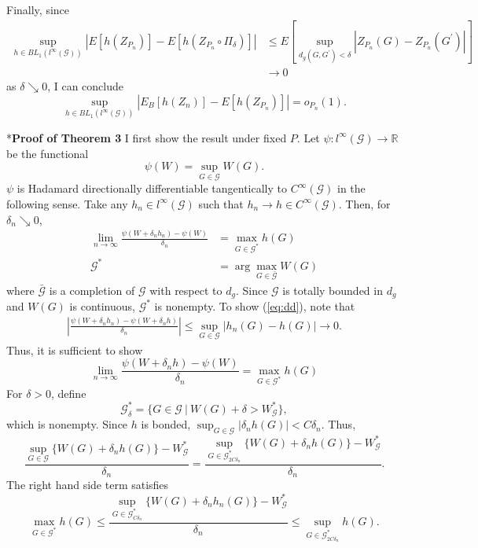 \documentclass[12pt,oneside,reqno,english]{amsart}
\makeatletter
\renewcommand\subsection{\@startsection{subsection}{2}%
  \z@{-.5\linespacing\@plus-.7\linespacing}{.5\linespacing}%
  {\normalfont\scshape}}
\theoremstyle{definition}
\makeatother
\begin{document}
Finally, since
\begin{align*}
\sup_{h\in BL_{1}(l^{\infty}(\mathcal{G}))}|E[h(Z_{P_{n}})]-E[h(Z_{P_{n}}\circ \Pi_{\delta})]|
&\leq E\left[\sup_{d_{g}(G,G^{\prime})<\delta}|Z_{P_{n}}(G)-Z_{P_{n}}(G^{\prime})|\right]\\
&\rightarrow 0
\end{align*}
as $\delta\searrow 0$, I can conclude
\[\sup_{h\in BL_{1}(l^{\infty}(\mathcal{G}))}|E_{B}[h(Z_{n})]-E[h(Z_{P_{n}})]|=o_{P_{n}}(1).\] 

\subsection*{\bf{Proof of Theorem 3}}
I first show the result under fixed $P$. 
Let $\psi:l^{\infty}(\mathcal{G})\rightarrow \mathbb{R}$ be the functional 
\[\psi(W)=\sup_{G\in \mathcal{G}}W(G).\]
$\psi$ is Hadamard directionally differentiable tangentically to $C^{\infty}(\mathcal{G})$ in the following sense. 
Take any $h_{n}\in l^{\infty}(\mathcal{G})$ such that $h_{n}\rightarrow h\in C^{\infty}(\mathcal{G})$. Then, 
for $\delta_{n}\searrow 0$, 
\begin{align}
\lim_{n\rightarrow \infty}\frac{\psi(W+\delta_{n} h_{n})-\psi(W)}{\delta_{n}}
&=\max_{G\in \mathcal{G}^{*}}h(G)\label{eq:dd}\\
\mathcal{G}^{*}&=\arg\max_{G\in \bar{\mathcal{G}}}W(G)\nonumber
\end{align}
where $\bar{\mathcal{G}}$ is a completion of $\mathcal{G}$ with respect to $d_{g}$. Since $\mathcal{G}$ is totally bounded in $d_{g}$ and $W(G)$ is continuous, 
$\mathcal{G}^{*}$ is nonempty. To show (\ref{eq:dd}), note that
\begin{align*}
\left| \frac{\psi(W+\delta_{n} h_{n})-\psi(W+\delta_{n} h)}{\delta_{n}}\right|
\leq \sup_{G\in \mathcal{G}}|h_{n}(G)-h(G)|\rightarrow 0.
\end{align*}
Thus, it is sufficient to show 
\[\lim_{n\rightarrow \infty}\frac{\psi(W+\delta_{n} h)-\psi(W)}{\delta_{n}}
=\max_{G\in \mathcal{G}^{*}}h(G)\]
For $\delta>0$, define 
\[\mathcal{G}^{*}_{\delta}=\{G\in \mathcal{G}\ | \ W(G)+\delta >W^{*}_{\mathcal{G}}\},\]
which is nonempty.
Since $h$ is bonded, $\sup_{G\in \mathcal{G}}|\delta_{n} h(G)|<C\delta_{n}$. Thus,  
\[\frac{\sup_{G\in \mathcal{G}}\{W(G)+\delta_{n} h(G)\}-W^{*}_{\mathcal{G}}}{\delta_{n}}=
\frac{\sup_{G\in \mathcal{G}^{*}_{2C\delta_{n}}}\{W(G)+\delta_{n} h(G)\}-W^{*}_{\mathcal{G}}}{\delta_{n}}.
\] 
The right hand side term satisfies 
\[\max_{G\in \mathcal{G}^{*}}h(G) \leq \frac{\sup_{G\in \mathcal{G}^{*}_{C\delta_{n}}}\{W(G)+\delta_{n} h_{n}(G)\}-W^{*}_{\mathcal{G}}}{\delta_{n}}\leq \sup_{G\in \mathcal{G}^{*}_{2C\delta_{n}}}h(G).\]
\end{document}
